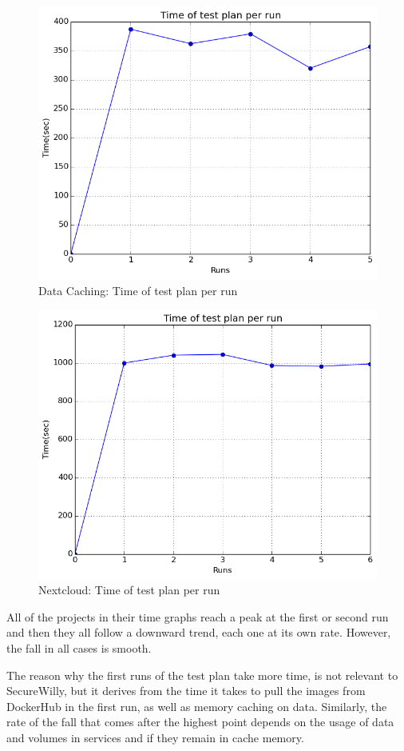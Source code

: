 \begin{figure}[h!]
  \centering
   \includegraphics[width=0.70\linewidth]{figures/datacaching/time.png}
   \caption{Data Caching: Time of test plan per run}
\end{figure}

\begin{figure}[h!]
  \centering
   \includegraphics[width=0.75\linewidth]{figures/nextcloud/time.png}
   \caption{Nextcloud: Time of test plan per run}
\end{figure}
\hfill\break

All of the projects in their time graphs reach a peak at the first or second run and then they all follow a downward trend, each one at its own rate. However, the fall in all cases is smooth.

The reason why the first runs of the test plan take more time, is not relevant to SecureWilly, but it derives from the time it takes to pull the images from DockerHub in the first run, as well as memory caching on data. Similarly, the rate of the fall that comes after the highest point depends on the usage of data and volumes in services and if they remain in cache memory.

